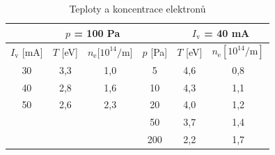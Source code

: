 \documentclass[a4paper,12pt]{article}
\begin{document}
\begin{center}
	\begin{table}[h!]
		\centering
		\caption{Teploty a koncentrace elektronů}
		\label{tab2}
		\begin{tabular}{|c|c|c|c|c|c|} \hline
			\multicolumn{1}{|c|}{}  & \multicolumn{2}{c|}{$p$ = 100 \si{\pascal}}& \multicolumn{1}{|c|}{} & \multicolumn{2}{c|}{$I_\text{v}$ = 40 \si{\milli\ampere} }  \\ \hline
			$I_\text{v}$ [\si{\milli\ampere}] &  $T$ [eV] & $n_\text{e} [10^{14}\si{\per\meter}$] & $p$ [\si{\pascal}] &  $T$ [eV] & $n_\text{e} [10^{14}\si{\per\meter}]$ \\ \hline
			30 & 3,3 & 1,0 & 5 & 4,6 & 0,8\\ \hline
			40 & 2,8 & 1,6 & 10 & 4,3 & 1,1 \\ \hline
			50 & 2,6 & 2,3 & 20 & 4,0 & 1,2\\ \hline
			&  &  & 50 & 3,7 & 1,4 \\ \hline
			& &  & 200 & 2,2 & 1,7 \\ \hline
			
		\end{tabular}
	\end{table}
\end{center}
\newpage
\end{document}
